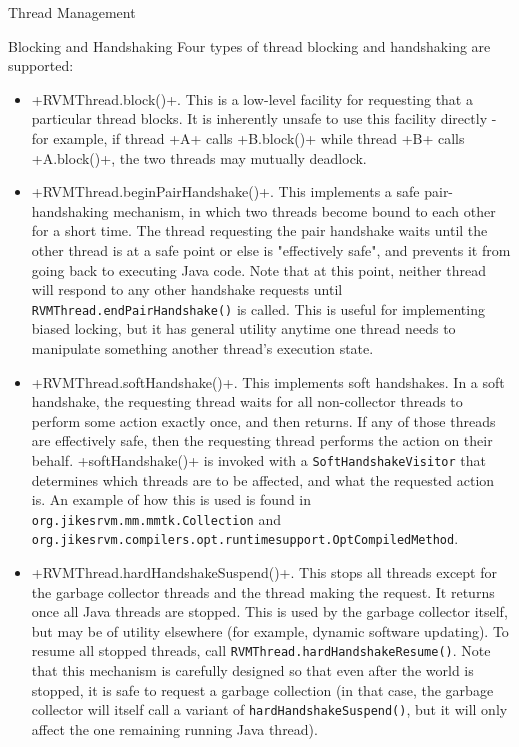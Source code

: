 \begin{section}{Thread Management}
\begin{subsection}{Blocking and Handshaking}
Four types of thread blocking and handshaking are supported:
\begin{itemize}
  \item \spverb+RVMThread.block()+. This is a low-level facility for requesting that a particular thread blocks. It is inherently unsafe to use this facility directly - for example, if thread \spverb+A+ calls \spverb+B.block()+ while thread \spverb+B+ calls \spverb+A.block()+, the two threads may mutually deadlock.
  \item \spverb+RVMThread.beginPairHandshake()+. This implements a safe pair-handshaking mechanism, in which two threads become bound to each other for a short time. The thread requesting the pair handshake waits until the other thread is at a safe point or else is "effectively safe", and prevents it from going back to executing Java code. Note that at this point, neither thread will respond to any other handshake requests until \texttt{RVM\-Thread.end\-Pair\-Hand\-sha\-ke()} is called. This is useful for implementing biased locking, but it has general utility anytime one thread needs to manipulate something another thread's execution state.
  \item \spverb+RVMThread.softHandshake()+. This implements soft handshakes. In a soft handshake, the requesting thread waits for all non-collector threads to perform some action exactly once, and then returns. If any of those threads are effectively safe, then the requesting thread performs the action on their behalf. \spverb+softHandshake()+ is invoked with a \texttt{Soft\-Hand\-sha\-ke\-Vi\-si\-tor} that determines which threads are to be affected, and what the requested action is. An example of how this is used is found in \texttt{org.ji\-kes\-rvm.mm.mmtk.Col\-lec\-tion} and \texttt{org.ji\-kes\-rvm.com\-pi\-lers.opt.run\-ti\-me\-sup\-port.Opt\-Com\-pi\-led\-Me\-thod}.
  \item \spverb+RVMThread.hardHandshakeSuspend()+. This stops all threads except for the garbage collector threads and the thread making the request. It returns once all Java threads are stopped. This is used by the garbage collector itself, but may be of utility elsewhere (for example, dynamic software updating). To resume all stopped threads, call \texttt{RVM\-Thread.hard\-Hand\-sha\-ke\-Re\-su\-me()}. Note that this mechanism is carefully designed so that even after the world is stopped, it is safe to request a garbage collection (in that case, the garbage collector will itself call a variant of \texttt{hard\-Hand\-sha\-ke\-Sus\-pend()}, but it will only affect the one remaining running Java thread).
\end{itemize}


\end{subsection}
\end{section}
